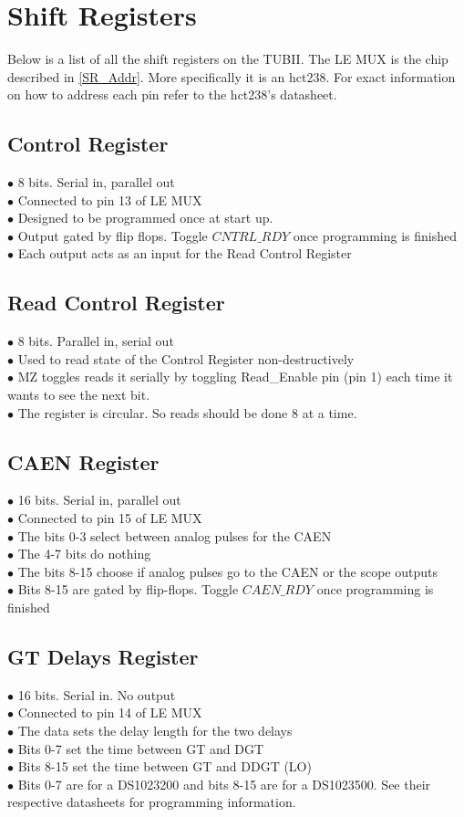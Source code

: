 \documentclass[11pt,a4paper]{article}
\begin{document}
\section{Shift Registers}
Below is a list of all the shift registers on the TUBII. The LE MUX is the chip described in \ref{SR_Addr}. More specifically it is an hct238.  For exact information on how to address each pin refer to the hct238's datasheet.
\subsection{Control Register}
$\bullet$ 8 bits. Serial in, parallel out\\
$\bullet$ Connected to pin 13 of LE MUX\\
$\bullet$ Designed to be programmed once at start up.\\
$\bullet$ Output gated by flip flops. Toggle $CNTRL\_RDY$ once programming is finished\\
$\bullet$ Each output acts as an input for the Read Control Register\\
\subsection{Read Control Register}
$\bullet$ 8 bits. Parallel in, serial out \\
$\bullet$ Used to read state of the Control Register non-destructively \\
$\bullet$ MZ toggles reads it serially by toggling Read\_Enable pin (pin 1) each time it wants to see the next bit.\\
$\bullet$ The register is circular. So reads should be done 8 at a time.\\
\subsection{CAEN Register}
$\bullet$ 16 bits. Serial in, parallel out\\
$\bullet$ Connected to pin 15 of LE MUX \\
$\bullet$ The bits 0-3 select between analog pulses for the CAEN\\
$\bullet$ The 4-7 bits do nothing\\
$\bullet$ The bits 8-15 choose if analog pulses go to the CAEN or the scope outputs\\
$\bullet$ Bits 8-15 are gated by flip-flops. Toggle $CAEN\_RDY$ once programming is finished\\
\subsection{GT Delays Register}
$\bullet$ 16 bits. Serial in. No output\\
$\bullet$ Connected to pin 14 of LE MUX\\
$\bullet$ The data sets the delay length for the two delays\\
$\bullet$ Bits 0-7 set the time between GT and DGT\\
$\bullet$ Bits 8-15 set the time between GT and DDGT (LO)\\
$\bullet$ Bits 0-7 are for a DS1023200 and bits 8-15 are for a DS1023500. See their respective datasheets for programming information.\\
\end{document}
